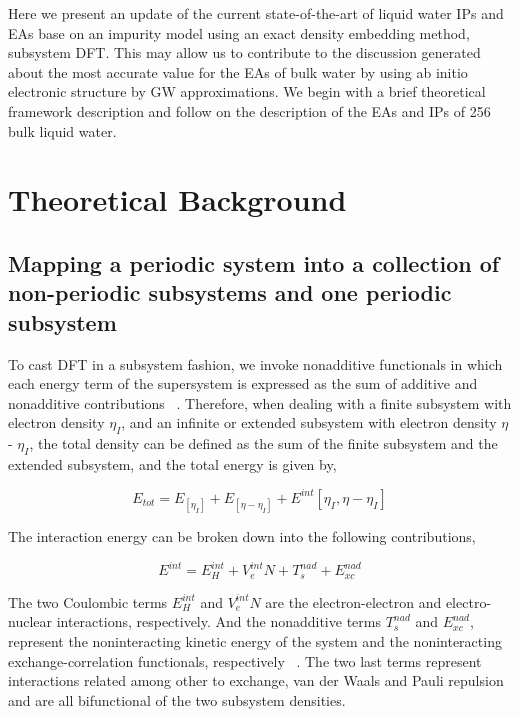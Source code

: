 \documentclass[12pt,a4paper]{article}
\begin{document}
Here we present an update of the current state-of-the-art of liquid water IPs and EAs base on an impurity model using an exact density
embedding method, subsystem DFT. This may allow us to contribute to the discussion generated about the most accurate value for the EAs of bulk water
by using ab initio electronic structure \cite{ambrosio2017electronic, gaiduk2018electron} by GW approximations. We begin with a brief theoretical
framework description and follow on the description of the EAs and IPs of 256 bulk liquid water.


\section{Theoretical Background}

\subsection{Mapping a periodic system into a collection of non-periodic subsystems and one periodic subsystem}

To cast DFT in a subsystem fashion, we invoke nonadditive functionals in which each energy term of the supersystem is expressed as the sum of additive
and nonadditive contributions ~\cite{martyna1999reciprocal}. Therefore, when dealing with a finite subsystem with electron density $\eta_I$, and an
infinite or extended subsystem with electron density $\eta$ - $\eta_I$, the total density can be defined as the sum of the finite subsystem and the
extended subsystem, and the total energy is given by,

\begin{equation}
	E_{tot} = {E_[{\eta}_I]} + {E_[{\eta} - {\eta}_I]} + {E^{int}[{\eta}_I, {\eta} - {\eta}_I] } 
\end{equation}

The interaction energy can be broken down into the following contributions,

\begin{equation}
	E^{int} = E^{int}_H + V^{int}_eN + T^{nad}_s + E^{nad}_{xc} 
\end{equation}

The two Coulombic terms $E^{int}_H$ and $V^{int}_eN$ are the electron-electron and electro-nuclear interactions, respectively. And the
nonadditive terms $T^{nad}_s$ and $E^{nad}_{xc}$, represent the noninteracting kinetic energy of the system and the noninteracting
exchange-correlation functionals, respectively ~\cite{krishtal2015subsystem}. The two last terms represent interactions related among other to exchange, van der Waals and Pauli repulsion and are all bifunctional of the two subsystem densities.
\end{document}

